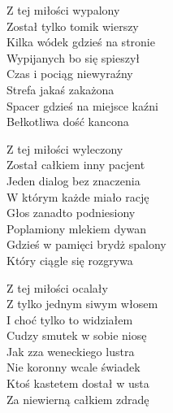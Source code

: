\begin{text}
    Z tej miłości wypalony\\
    Został tylko tomik wierszy\\
    Kilka wódek gdzieś na stronie\\
    Wypijanych bo się spieszył\\
    Czas i pociąg niewyraźny\\
    Strefa jakaś zakażona\\
    Spacer gdzieś na miejsce kaźni\\
    Bełkotliwa dość kancona

    Z tej miłości wyleczony\\
    Został całkiem inny pacjent\\
    Jeden dialog bez znaczenia\\
    W którym każde miało rację\\
    Głos zanadto podniesiony\\
    Poplamiony mlekiem dywan\\
    Gdzieś w pamięci brydż spalony\\
    Który ciągle się rozgrywa

    Z tej miłości ocalały\\
    Z tylko jednym siwym włosem\\
    I choć tylko to widziałem\\
    Cudzy smutek w sobie niosę\\
    Jak zza weneckiego lustra\\
    Nie koronny wcale świadek\\
    Ktoś kastetem dostał w usta\\
    Za niewierną całkiem zdradę
\end{text}
\begin{chord}

\end{chord}